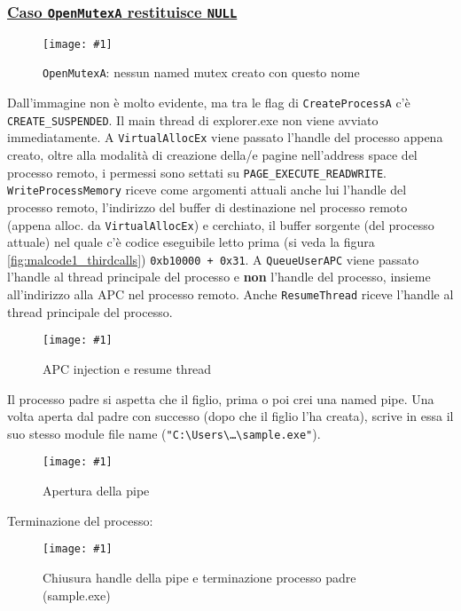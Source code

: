 \documentclass[
    a4paper, %
    11pt %
]{article}
\newcommand{\pic}[4]{\begin{figure}[H]
            \centering
            \texttt{[image: \#1]}
            \caption{#2}
            \label{fig:#1}
            \end{figure}}
\begin{document}
            \subsubsection*{\underline{Caso \texttt{OpenMutexA} restituisce \texttt{NULL}}}
            \pic{malcode1_fifthcalls}{\texttt{OpenMutexA}: nessun named mutex creato con questo nome}{12cm}{1.5cm}
            Dall'immagine non è molto evidente, ma tra le flag di \texttt{CreateProcessA} c'è \texttt{CREATE\_SUSPENDED}. 
            Il main thread di explorer.exe non viene avviato immediatamente.
            A \texttt{VirtualAllocEx} viene passato l'handle del processo appena creato, oltre alla modalità
            di creazione della/e pagine nell'address space del processo remoto, i permessi sono settati su 
            \texttt{PAGE\_EXECUTE\_READWRITE}.
            \texttt{WriteProcessMemory} riceve come argomenti attuali anche lui l'handle del processo remoto,
            l'indirizzo del buffer di destinazione nel processo remoto (appena alloc. da \texttt{VirtualAllocEx})
            e cerchiato, il buffer sorgente (del processo attuale) nel quale c'è codice eseguibile letto prima 
            (si veda la figura \ref{fig:malcode1_thirdcalls}) \texttt{0xb10000 + 0x31}.
            A \texttt{QueueUserAPC} viene passato l'handle al thread principale del processo e \textbf{non} l'handle
            del processo, insieme all'indirizzo alla APC nel processo remoto. Anche \texttt{ResumeThread} riceve
            l'handle al thread principale del processo.
            \pic{malcode1_sixthcalls}{APC injection e resume thread}{14cm}{3cm}
            Il processo padre si aspetta che il figlio, prima o poi crei una named pipe. Una volta aperta dal padre con successo (dopo che il figlio l'ha creata),
            scrive in essa il suo stesso module file name (\texttt{"C:\textbackslash Users\textbackslash \dots \textbackslash sample.exe"}).
            \pic{malcode1_seventhcalls}{Apertura della pipe}{11cm}{3cm}

            Terminazione del processo:
            \pic{malcode1_eightthcalls}{Chiusura handle della pipe e terminazione processo padre (sample.exe)}{6cm}{1.5cm}

            \pagebreak
            
\end{document}
